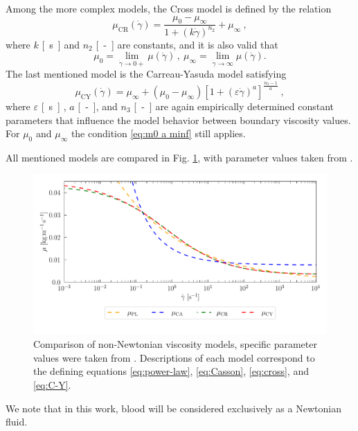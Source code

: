 Among the more complex models, the Cross model \cite{Sequeira} is defined by the relation
\begin{equation}\label{eq:cross}
	\mu _{\text{CR}} (\dot{\gamma}) = \frac{\mu_{0} - \mu_{\infty}}{1 + (k\dot{\gamma})^{n_2}} + \mu_{\infty}  \ ,
\end{equation}
where $ k $ \si{[s]} and $ n_2 $ \si{[-]} are constants, and it is also valid that
\begin{equation}\label{eq:m0 a minf}
	\mu _{0}  = \lim_{\dot{\gamma} \rightarrow 0+}\mu (\dot{\gamma})\, , \ \mu_{\infty} = \lim_{\dot{\gamma} \rightarrow \infty}\mu (\dot{\gamma}).
\end{equation}
The last mentioned model is the Carreau-Yasuda model \cite{Boyd2007} satisfying
\begin{equation}\label{eq:C-Y}
	\mu _{\text{CY}} (\dot{\gamma}) = \mu_{\infty} + (\mu_{0} - \mu_{\infty}) \left[ 1 + (\varepsilon \dot{\gamma}) ^{a} \right]^{\frac{n_3-1}{a}} \ ,
\end{equation}
where $ \varepsilon$ \si{[s]} , $a$ \si{[-]}, and $ n_3 $ \si{[-]} are again empirically determined constant parameters that influence the model behavior between boundary viscosity values. For $ \mu_{0}$ and $ \mu_{\infty} $ the condition \eqref{eq:m0 a minf} still applies.

All mentioned models are compared in Fig. \ref{fig:vs}, with parameter values taken from \cite{Eichler2023}.
\begin{figure}[H]
	\centering
	\includegraphics[width=1.0\textwidth]{figures/modely.pdf}
	\vspace{-9mm}
	\caption{Comparison of non-Newtonian viscosity models, specific parameter values were taken from \cite{Eichler2023}. Descriptions of each model correspond to the defining equations
		\eqref{eq:power-law}, \eqref{eq:Casson}, \eqref{eq:cross}, and \eqref{eq:C-Y}.}
	\label{fig:vs}
\end{figure}
We note that in this work, blood will be considered exclusively as a Newtonian fluid.

